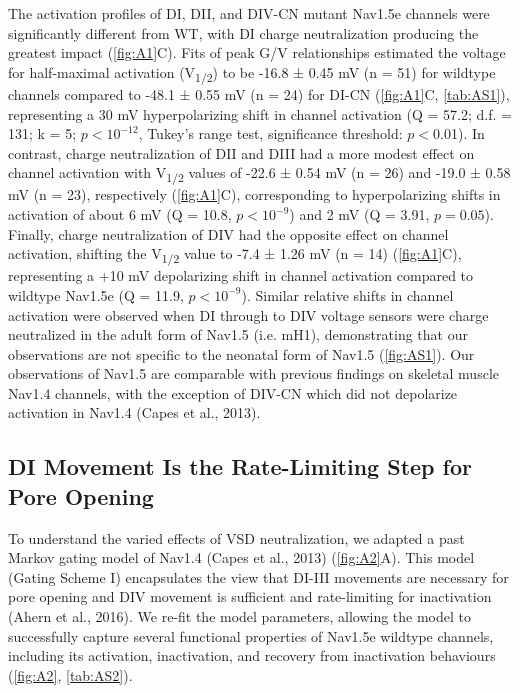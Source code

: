 The activation profiles of DI, DII, and DIV-CN mutant Nav1.5e channels were significantly different from WT, with DI charge neutralization producing the greatest impact (\autoref{fig:A1}C). Fits of peak G/V relationships estimated the voltage for half-maximal activation (V\textsubscript{1/2}) to be -16.8 ± 0.45 mV (n = 51) for wildtype channels compared to -48.1 ± 0.55 mV (n = 24) for DI-CN (\autoref{fig:A1}C, \autoref{tab:AS1}), representing a 30 mV hyperpolarizing shift in channel activation (Q = 57.2; d.f. = 131; k = 5; $p < 10^{-12}$, Tukey’s range test, significance threshold: $p < 0.0$1). In contrast, charge neutralization of DII and DIII had a more modest effect on channel activation with V\textsubscript{1/2} values of -22.6 ± 0.54 mV (n = 26) and -19.0 ± 0.58 mV (n = 23), respectively (\autoref{fig:A1}C), corresponding to hyperpolarizing shifts in activation of about 6 mV (Q = 10.8, $p < 10^{-9}$) and 2 mV (Q = 3.91, $p = 0.05$). Finally, charge neutralization of DIV had the opposite effect on channel activation, shifting the V\textsubscript{1/2} value to -7.4 ± 1.26 mV (n = 14) (\autoref{fig:A1}C), representing a +10 mV depolarizing shift in channel activation compared to wildtype Nav1.5e (Q = 11.9, $p < 10^{-9}$). Similar relative shifts in channel activation were observed when DI through to DIV voltage sensors were charge neutralized in the adult form of Nav1.5 (i.e. mH1), demonstrating that our observations are not specific to the neonatal form of Nav1.5 (\autoref{fig:AS1}). Our observations of Nav1.5 are comparable with previous findings on skeletal muscle Nav1.4 channels, with the exception of DIV-CN which did not depolarize activation in Nav1.4 (Capes et al., 2013).

\subsection{DI Movement Is the Rate-Limiting Step for Pore Opening}
To understand the varied effects of VSD neutralization, we adapted a past Markov gating model of Nav1.4 (Capes et al., 2013) (\autoref{fig:A2}A). This model (Gating Scheme I) encapsulates the view that DI-III movements are necessary for pore opening and DIV movement is sufficient and rate-limiting for inactivation (Ahern et al., 2016). We re-fit the model parameters, allowing the model to successfully capture several functional properties of Nav1.5e wildtype channels, including its activation, inactivation, and recovery from inactivation behaviours (\autoref{fig:A2}, \autoref{tab:AS2}). 

